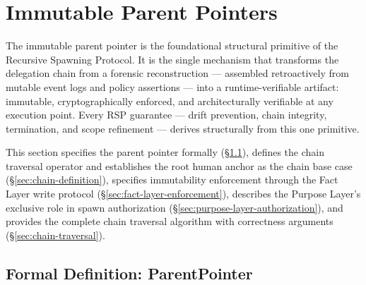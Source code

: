 \section{Immutable Parent Pointers}
\label{sec:immutable-parent-pointers}

The immutable parent pointer is the foundational structural primitive of the Recursive Spawning Protocol. It is the single mechanism that transforms the delegation chain from a forensic reconstruction — assembled retroactively from mutable event logs and policy assertions — into a runtime-verifiable artifact: immutable, cryptographically enforced, and architecturally verifiable at any execution point. Every RSP guarantee — drift prevention, chain integrity, termination, and scope refinement — derives structurally from this one primitive.

This section specifies the parent pointer formally (\S\ref{sec:parent-pointer-formal}), defines the chain traversal operator and establishes the root human anchor as the chain base case (\S\ref{sec:chain-definition}), specifies immutability enforcement through the Fact Layer write protocol (\S\ref{sec:fact-layer-enforcement}), describes the Purpose Layer's exclusive role in spawn authorization (\S\ref{sec:purpose-layer-authorization}), and provides the complete chain traversal algorithm with correctness arguments (\S\ref{sec:chain-traversal}).

\subsection{Formal Definition: ParentPointer}
\label{sec:parent-pointer-formal}


